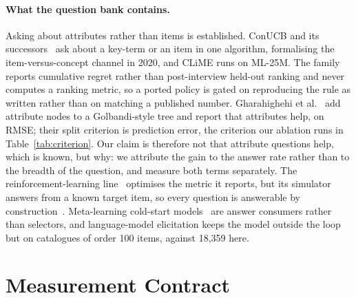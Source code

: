 \documentclass[runningheads]{llncs}
\begin{document}
\paragraph{What the question bank contains.}
Asking about attributes rather than items is established. ConUCB and its
successors~\cite{zhang2020conucb,wang2023conlinucb,liu2025clisk} ask about a key-term or an item in
one algorithm, formalising the item-versus-concept channel in 2020, and CLiME runs on ML-25M. The
family reports cumulative regret rather than post-interview held-out ranking and never computes a
ranking metric, so a ported policy is gated on reproducing the rule as written rather than on
matching a published number. Gharahighehi et al.~\cite{gharahighehi2025pairwise} add attribute nodes
to a Golbandi-style tree and report that attributes help, on RMSE; their split criterion is
prediction error, the criterion our ablation runs in Table~\ref{tab:criterion}. Our claim is therefore not that attribute questions help, which is
known, but why: we attribute the gain to the answer rate rather than to the breadth of the question,
and measure both terms separately. The
reinforcement-learning
line~\cite{sun2018conversational,lei2020estimation,lei2020interactive,deng2021unicorn,li2021seamlessly}
optimises the metric it reports, but its simulator answers from a known target item, so every question
is answerable by construction~\cite{kim2024targetfree,zhang2022minicorn}. Meta-learning cold-start
models~\cite{lee2019melu,lin2021tanp} are answer consumers rather than selectors, and language-model
elicitation keeps the model outside the loop~\cite{austin2024bayesian} but on catalogues of order 100
items, against 18{,}359 here.

\section{Measurement Contract}
\label{sec:contract}
\end{document}
